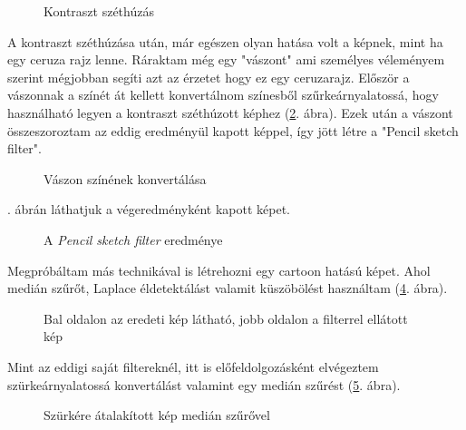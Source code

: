 \begin{figure}[ht]
\centering
{}
\caption{Kontraszt széthúzás} 
\label{fig:pencil5}
\end{figure}


A kontraszt széthúzása után, már egészen olyan hatása volt a képnek, mint ha egy ceruza rajz lenne. Ráraktam még egy "vászont" ami személyes véleményem szerint mégjobban segíti azt az érzetet hogy ez egy ceruzarajz. Először a vászonnak a színét át kellett konvertálnom színesből szűrkeárnyalatossá, hogy használható legyen a kontraszt széthúzott képhez (\ref{fig:pencil6}. ábra). Ezek után a vászont összeszoroztam az eddig eredményül kapott képpel, így jött létre a "Pencil sketch filter".

\begin{figure}[ht] 
\centering
{}
\caption{Vászon színének konvertálása}
\label{fig:pencil6}
\end{figure}

. ábrán láthatjuk a végeredményként kapott képet.

\begin{figure}[ht]
\centering
{}
\caption{A \textit{Pencil sketch filter} eredménye} 
\label{fig:pencil7}
\end{figure}


Megpróbáltam más technikával is létrehozni egy cartoon hatású képet. Ahol medián szűrőt, Laplace éldetektálást valamit küszöbölést használtam (\ref{fig:2_cartoon1}. ábra).

\begin{figure}[ht]
\centering
{}
\caption{Bal oldalon az eredeti kép látható, jobb oldalon a filterrel ellátott kép} 
\label{fig:2_cartoon1}
\end{figure}


Mint az eddigi saját filtereknél, itt is előfeldolgozásként elvégeztem szürkeárnyalatossá konvertálást valamint egy medián szűrést (\ref{fig:2_cartoon2}. ábra).

\begin{figure}[ht]
\centering
{}
\caption{Szürkére átalakított kép medián szűrővel} 
\label{fig:2_cartoon2}
\end{figure}

